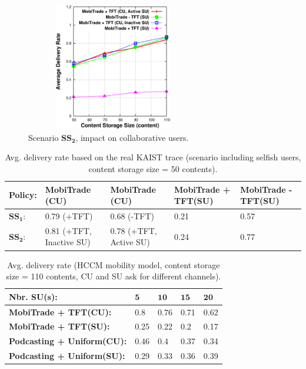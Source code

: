 \begin{figure}[!h]
  \begin{center}
    \includegraphics[width=3in,height=2.2in]{Chapitre5/fig6.eps}
  \end{center}
  \caption{Scenario $\mathbf{SS_2}$, impact on collaborative users.}
  \label{MN+ECH+ICN}
\end{figure}

\begin{table}[!h]
\vspace{-0.1in}
\caption{Avg. delivery rate based on the real KAIST trace (scenario including selfish users, content storage size = 50 contents).}
\centering
\label{table:kaist:mal}
\footnotesize
\begin{tabular}{|p{1.5cm}|p{2.5cm}|p{2.5cm}|p{2.5cm}|p{2.5cm}|}
\hline
\bfseries Policy:& \bfseries MobiTrade (CU) & \bfseries MobiTrade (CU)& \bfseries MobiTrade + TFT(SU) & \bfseries MobiTrade - TFT(SU)\\
\hline
$\mathbf{SS_{1}}$: & 0.79 (+TFT)& 0.68 (-TFT) & 0.21& 0.57 \\
\hline
$\mathbf{SS_{2}}$: & 0.81 (+TFT, Inactive SU) & 0.78 (+TFT, Active SU) &0.24&0.77\\
\hline
\end{tabular}
\end{table}

\begin{table}[!h]
\vspace{-0.1in}
\caption{Avg. delivery rate (HCCM mobility model, content storage size = 110 contents, CU and SU ask for different channels).}
\centering
\label{table:hcmm:vss}
\footnotesize
\begin{tabular}{|p{5cm}|p{0.8cm}|p{0.8cm}|p{0.8cm}|p{0.8cm}|}
\hline
\bfseries Nbr. SU(s):& $\mathbf{5}$ & $\mathbf{10}$& $\mathbf{15}$ & $\mathbf{20}$\\
\hline
\bfseries MobiTrade + TFT(CU): & 0.8 & 0.76 &0.71 &0.62 \\
\hline
\bfseries MobiTrade + TFT(SU): & 0.25 & 0.22 &0.2&0.17\\
\hline
\bfseries Podcasting + Uniform(CU): &  0.46&0.4 &0.37&0.34\\
\hline
\bfseries Podcasting + Uniform(SU): & 0.29&0.33&0.36&0.39\\
\hline
\end{tabular}
\end{table}

